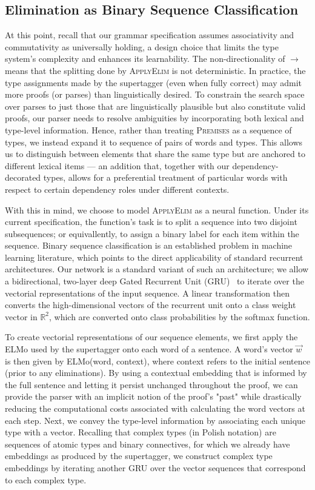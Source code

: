 \subsection{Elimination as Binary Sequence Classification}
\label{subsec:model}
At this point, recall that our grammar specification assumes associativity and commutativity as universally holding, a design choice that limits the type system's complexity and enhances its learnability.
The non-directionality of $\rightarrow$ means that the splitting done by \textsc{ApplyElim} is not deterministic.
In practice, the type assignments made by the supertagger (even when fully correct) may admit more proofs (or parses) than linguistically desired.
To constrain the search space over parses to just those that are linguistically plausible but also constitute valid proofs, our parser needs to resolve ambiguities by incorporating both lexical and type-level information.
Hence, rather than treating \textsc{Premises} as a sequence of types, we instead expand it to sequence of pairs of words and types.
This allows us to distinguish between elements that share the same type but are anchored to different lexical items --- an addition that, together with our dependency-decorated types, allows for a preferential treatment of particular words with respect to certain dependency roles under different contexts.

With this in mind, we choose to model \textsc{ApplyElim} as a neural function.
Under its current specification, the function's task is to split a sequence into two disjoint subsequences; or equivallently, to assign a binary label for each item within the sequence.
Binary sequence classification is an established problem in machine learning literature, which points to the direct applicability of standard recurrent architectures.
Our network is a standard variant of such an architecture; we allow a bidirectional, two-layer deep Gated Recurrent Unit (GRU)~\cite{gru} to iterate over the vectorial representations of the input sequence.
A linear transformation then converts the high-dimensional vectors of the recurrent unit onto a class weight vector in $\mathbb{R}^2$, which are converted onto class probabilities by the softmax function.

To create vectorial representations of our sequence elements, we first apply the ELMo used by the supertagger onto each word of a sentence.
A word's vector $\overrightarrow{w}$ is then given by ELMo(word, context), where context refers to the initial sentence (prior to any eliminations).
By using a contextual embedding that is informed by the full sentence and letting it persist unchanged throughout the proof, we can provide the parser with an implicit notion of the proof's "past" while drastically reducing the computational costs associated with calculating the word vectors at each step.
Next, we convey the type-level information by associating each unique type with a vector.
Recalling that complex types (in Polish notation) are sequences of atomic types and binary connectives, for which we already have embeddings as produced by the supertagger, we construct complex type embeddings by iterating another GRU over the vector sequences that correspond to each complex type.

